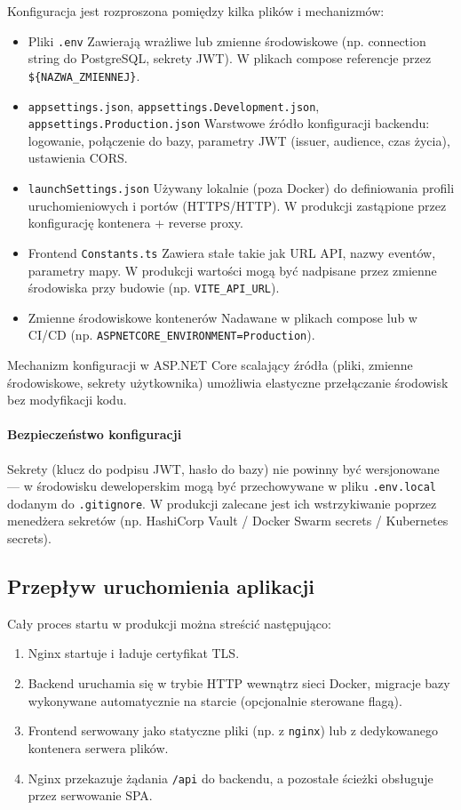 Konfiguracja jest rozproszona pomiędzy kilka plików i mechanizmów:
\begin{itemize}
    \item Pliki \texttt{.env} Zawierają wrażliwe lub zmienne środowiskowe (np. connection string do PostgreSQL, sekrety JWT). W plikach compose referencje przez \texttt{\$\{NAZWA\_ZMIENNEJ\}}.
    \item \texttt{appsettings.json}, \texttt{appsettings.Development.json}, \texttt{appsettings.Production.json} Warstwowe źródło konfiguracji backendu: logowanie, połączenie do bazy, parametry JWT (issuer, audience, czas życia), ustawienia CORS.
    \item \texttt{launchSettings.json} Używany lokalnie (poza Docker) do definiowania profili uruchomieniowych i portów (HTTPS/HTTP). W produkcji zastąpione przez konfigurację kontenera + reverse proxy.
    \item Frontend \texttt{Constants.ts} Zawiera stałe takie jak URL API, nazwy eventów, parametry mapy. W produkcji wartości mogą być nadpisane przez zmienne środowiska przy budowie (np. \texttt{VITE\_API\_URL}).
    \item Zmienne środowiskowe kontenerów Nadawane w plikach compose lub w CI/CD 
    (np. \texttt{ASPNETCORE\_ENVIRONMENT=Production}).
\end{itemize}

Mechanizm konfiguracji w ASP.NET Core scalający źródła (pliki, zmienne środowiskowe, sekrety użytkownika) umożliwia elastyczne przełączanie środowisk bez modyfikacji kodu.

\paragraph{Bezpieczeństwo konfiguracji} Sekrety (klucz do podpisu JWT, hasło do bazy) nie powinny być wersjonowane --- w środowisku deweloperskim mogą być przechowywane w pliku \texttt{.env.local} dodanym do \texttt{.gitignore}. W produkcji zalecane jest ich wstrzykiwanie poprzez menedżera sekretów (np. HashiCorp Vault / Docker Swarm secrets / Kubernetes secrets).

\subsection{Przepływ uruchomienia aplikacji}

Cały proces startu w produkcji można streścić następująco:
\begin{enumerate}
    \item Nginx startuje i ładuje certyfikat TLS.
    \item Backend uruchamia się w trybie HTTP wewnątrz sieci Docker, migracje bazy wykonywane automatycznie na starcie (opcjonalnie sterowane flagą).
    \item Frontend serwowany jako statyczne pliki (np. z \texttt{nginx}) lub z dedykowanego kontenera serwera plików.
    \item Nginx przekazuje żądania \texttt{/api} do backendu, a pozostałe ścieżki obsługuje przez serwowanie SPA.
\end{enumerate}

